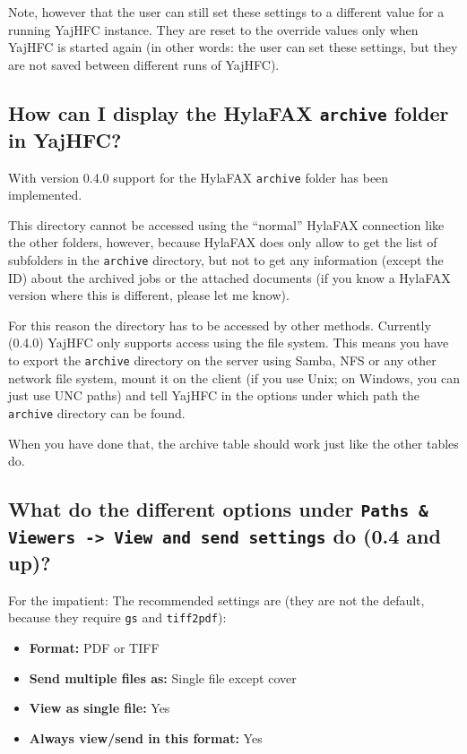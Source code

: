 \documentclass[a4paper,10pt]{scrartcl}
\begin{document}
Note, however that the user can still set these settings to a different value for a running YajHFC instance. They are reset to the override values only when YajHFC is started again (in other words: the user can set these settings, but they are not saved between different runs of YajHFC).


\subsection{How can I display the HylaFAX \texttt{archive} folder in YajHFC?}

With version 0.4.0 support for the HylaFAX \texttt{archive} folder has been implemented.

This directory cannot be accessed using the "`normal"' HylaFAX connection like the other folders, however, because HylaFAX does only allow to get the list of subfolders in the \texttt{archive} directory, but not to get any information (except the ID) about the archived jobs or the attached documents (if you know a HylaFAX version where this is different, please let me know).

For this reason the directory has to be accessed by other methods. Currently (0.4.0) YajHFC only supports access using the file system. This means you have to export the  \texttt{archive} directory on the server using Samba, NFS or any other network file system, mount it on the client (if you use Unix; on Windows, you can just use UNC paths) and tell YajHFC in the options under which path the \texttt{archive} directory can be found.

When you have done that, the archive table should work just like the other tables do.

\subsection{What do the different options under \texttt{Paths \& Viewers -> View and send settings} do (0.4 and up)?}

For the impatient: The recommended settings are (they are not the default, because they require \texttt{gs} and \texttt{tiff2pdf}):
\begin{itemize}
 \item \textbf{Format:} PDF or TIFF
 \item \textbf{Send multiple files as:} Single file except cover
 \item \textbf{View as single file:} Yes
 \item \textbf{Always view/send in this format:} Yes
\end{itemize}
\end{document}

